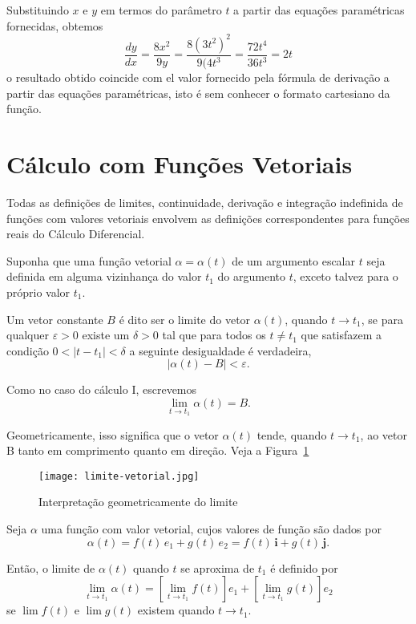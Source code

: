 Substituindo \(x\) e \(y\) em termos do parâmetro \(t\) a partir das equações paramétricas fornecidas, obtemos
\begin{equation*}
  \frac{dy}{dx}=\frac{8x^{2}}{9y}=\frac{8(3t^{2})^{2}}{9(4t^{3}}=\frac{72t^{4}}{36t^{3}}=2t
\end{equation*}
o resultado obtido coincide com el valor fornecido pela fórmula de derivação  a 
partir das equações paramétricas, isto é sem conhecer o formato cartesiano da 
função.

%
\section{Cálculo com Funções Vetoriais}
%
Todas as definições de limites, continuidade, derivação e integração indefinida de funções com valores vetoriais envolvem as definições
correspondentes para funções reais do Cálculo Diferencial.

Suponha que uma função vetorial \(\alpha=\alpha(t)\) de um argumento escalar \(t\) 
seja definida em alguma vizinhança do valor \(t_{1}\) do argumento \(t\), exceto 
talvez para o próprio valor \(t_{1}\).

Um vetor constante \(B\) é dito ser o limite do vetor \(\alpha(t)\), quando  
\(t\to t_{1}\), se para qualquer \(\varepsilon > 0\) existe um \(\delta > 0\) tal que para todos os \(t \neq  t_{1}\) que satisfazem a condição \(0< |t-t_{1}|< \delta\) a seguinte desigualdade é verdadeira,
\begin{equation*}
\left|\alpha(t)-B\right| < \varepsilon.
\end{equation*}

Como no caso do cálculo I, escrevemos
\begin{equation*}
 \lim_{t \to t_{1}}\alpha(t)=B.
\end{equation*}

Geometricamente, isso significa que o vetor \(\alpha(t)\) tende, quando \(t\to t_{1}\), ao vetor B tanto em comprimento quanto em direção. Veja a Figura~\ref{fig:1-5}
\begin{figure}[H]
\centering
\texttt{[image: limite-vetorial.jpg]}
\caption{Interpretação geometricamente do limite}
\label{fig:1-5}
\end{figure}

\begin{defi}\label{def:14-4-1}
Seja \(\alpha\) uma função com valor vetorial, cujos valores de função são dados por
\begin{equation*}
\alpha(t) = f(t)\,e_{1} + g(t)\,e_{2}= f(t)\,\boldsymbol{i} + g(t)\, \boldsymbol{j}.
\end{equation*}

Então, o limite de \(\alpha(t)\) quando \(t\) se aproxima de \(t_{1}\) é definido por
\begin{equation*}
  \lim_{t \to t_{1}}\alpha(t) =\left[\lim_{t \to t_{1}}f(t)\right]e_{1}+ \left[ \lim_{t \to t_{1}}g(t)\right]e_{2}
\end{equation*}
se \(\lim f (t)\) e \(\lim g (t)\) existem quando \( t \to t_{1}\).
\end{defi}

